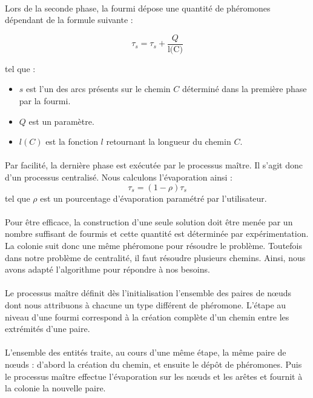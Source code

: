 \documentclass[a4paper, 10pt]{report}
\begin{document}
\paragraph{}Lors de la seconde phase, la fourmi dépose une quantité de phéromones dépendant de la formule suivante :

$$
	\tau_s = \tau_s + \frac{Q}{\text{l(C)}}
$$

tel que :
\begin{itemize}
	\item $s$ est l'un des arcs présents sur le chemin $C$ déterminé dans la première phase par la fourmi.
    \item $Q$ est un paramètre.
    \item $l(C)$ est la fonction $l$ retournant la longueur du chemin $C$.
\end{itemize}

\paragraph{}Par facilité, la dernière phase est exécutée par le processus maître. Il s'agit donc d'un processus centralisé. Nous calculons l'évaporation ainsi :
$$
	\tau_s = (1-\rho)\tau_s 
$$
tel que $\rho$ est un pourcentage d'évaporation paramétré par l'utilisateur.

\paragraph{}Pour être efficace, la construction d'une seule solution doit être menée par un nombre suffisant de fourmis et cette quantité est déterminée par expérimentation. La colonie suit donc une même phéromone pour résoudre le problème. Toutefois dans notre problème de centralité, il faut résoudre plusieurs chemins. Ainsi, nous avons adapté l'algorithme pour répondre à nos besoins. 

\paragraph{}Le processus maître définit dès l'initialisation l'ensemble des paires de n\oe uds dont nous attribuons à chacune un type différent de phéromone. L'étape au niveau d'une fourmi correspond à la création complète d'un chemin entre les extrémités d'une paire.

\paragraph{}L'ensemble des entités traite, au cours d'une même étape, la même paire de n\oe uds : d'abord la création du chemin, et ensuite le dépôt de phéromones. Puis le processus maître effectue l'évaporation sur les n\oe uds et les arêtes et fournit à la colonie la nouvelle paire.
\end{document}
